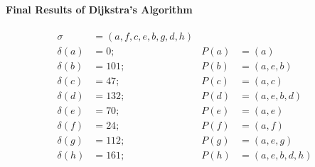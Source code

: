 \documentclass[10pt,]{book}
\theoremstyle{plain}
\theoremstyle{definition}
\theoremstyle{definition}
\theoremstyle{definition}
\theoremstyle{definition}
\numberwithin{equation}{section}
\newcommand{\amp}{&}
\begin{document}
\paragraph[{Final Results of Dijkstra's Algorithm}]{Final Results of Dijkstra's Algorithm}\hypertarget{paragraphs-8}{}
\hypertarget{p-213}{}%
%
\begin{align*}
\sigma\amp=(a,f,c,e,b,g,d,h)\\
\delta(a)\amp=0; \amp P(a)\amp=(a)\\
\delta(b)\amp=101; \amp P(b)\amp=(a,e,b)\\
\delta(c)\amp=47; \amp P(c)\amp=(a,c)\\
\delta(d)\amp= 132; \amp P(d)\amp=(a,e,b,d)\\
\delta(e)\amp=70; \amp P(e)\amp=(a,e)\\
\delta(f)\amp=24; \amp P(f)\amp=(a,f)\\
\delta(g)\amp=112; \amp P(g)\amp=(a,e,g)\\
\delta(h)\amp=161; \amp P(h)\amp=(a,e,b,d,h)
\end{align*}
%
\typeout{************************************************}
\typeout{************************************************}
\end{document}
